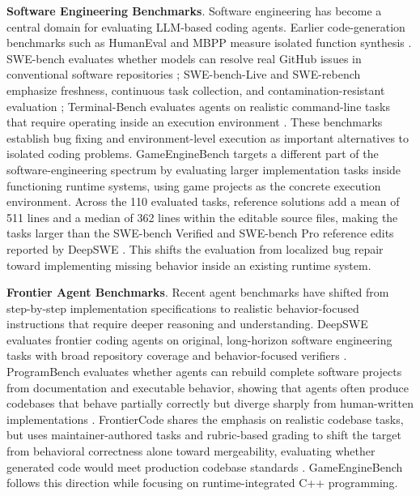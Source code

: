 \documentclass[11pt]{article}
\newcommand{\benchmarkname}{GameEngineBench\xspace}
\begin{document}
\textbf{Software Engineering Benchmarks}. Software engineering has become a central domain for evaluating LLM-based coding agents. Earlier code-generation benchmarks such as HumanEval and MBPP measure isolated function synthesis \citep{chen2021evaluating,austin2021programsynthesis}. SWE-bench evaluates whether models can resolve real GitHub issues in conventional software repositories \citep{jimenez2023swebench}; SWE-bench-Live and SWE-rebench emphasize freshness, continuous task collection, and contamination-resistant evaluation \citep{zhang2025swebenchlive,badertdinov2025swerebench}; Terminal-Bench evaluates agents on realistic command-line tasks that require operating inside an execution environment \citep{merrill2026terminalbench}. These benchmarks establish bug fixing and environment-level execution as important alternatives to isolated coding problems. \benchmarkname targets a different part of the software-engineering spectrum by evaluating larger implementation tasks inside functioning runtime systems, using game projects as the concrete execution environment. Across the 110 evaluated tasks, reference solutions add a mean of 511 lines and a median of 362 lines within the editable source files, making the tasks larger than the SWE-bench Verified and SWE-bench Pro reference edits reported by DeepSWE \citep{huang2026deepswe}. This shifts the evaluation from localized bug repair toward implementing missing behavior inside an existing runtime system.

\textbf{Frontier Agent Benchmarks}. Recent agent benchmarks have shifted from step-by-step implementation specifications to realistic behavior-focused instructions that require deeper reasoning and understanding. DeepSWE evaluates frontier coding agents on original, long-horizon software engineering tasks with broad repository coverage and behavior-focused verifiers \citep{huang2026deepswe}. ProgramBench evaluates whether agents can rebuild complete software projects from documentation and executable behavior, showing that agents often produce codebases that behave partially correctly but diverge sharply from human-written implementations \citep{yang2026programbench}. FrontierCode shares the emphasis on realistic codebase tasks, but uses maintainer-authored tasks and rubric-based grading to shift the target from behavioral correctness alone toward mergeability, evaluating whether generated code would meet production codebase standards \citep{lu2026frontiercode}. \benchmarkname follows this direction while focusing on runtime-integrated C++ programming.
\end{document}
